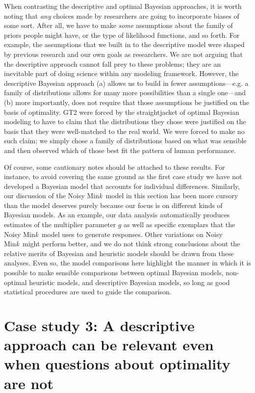 \documentclass[doc,floatsintext]{apa6}
\newcommand{\mink}{{Min\textit{k}\ }}
\begin{document}
When contrasting the descriptive and optimal Bayesian approaches, it is worth noting that {\it any} choices made by researchers are going to incorporate biases of some sort. After all, we have to make {\it some} assumptions about the family of priors people might have, or the type of likelihood functions, and so forth. For example, the assumptions that we built in to the descriptive model were shaped by previous research and our own goals as researchers. We are not arguing that the descriptive approach cannot fall prey to these problems; they are an inevitable part of doing science within any modeling framework.  However, the descriptive Bayesian approach (a) allows us to build in fewer assumptions---e.g. a family of distributions allows for many more possibilities than a single one---and (b) more importantly, does not require that those assumptions be justified on the basis of optimality. GT2 were forced by the straightjacket of optimal Bayesian modeling to have to claim that the distributions they chose were justified on the basis that they were well-matched to the real world. We were forced to make no such claim; we simply chose a family of distributions based on what was sensible and then observed which of those best fit the pattern of human performance.

Of course, some cautionary notes should be attached to these results. For instance, to avoid covering the same ground as the first case study we have not developed a Bayesian model that accounts for individual differences. Similarly, our discussion of the Noisy \mink model in this section has been more cursory than the model deserves purely because our focus is on different kinds of Bayesian models. As an example, our data analysis automatically produces estimates of the multiplier parameter $g$ as well as specific exemplars that the Noisy \mink model uses to generate responses. Other variations on Noisy \mink might perform better, and we do not think strong conclusions about the relative merits of Bayesian and heuristic models should be drawn from these analyses. Even so, the model comparisons here highlight the manner in which it is possible to make sensible comparisons between optimal Bayesian models, non-optimal heuristic models, and descriptive Bayesian models, so long as good statistical procedures are used to guide the comparison.





\section*{Case study 3: A descriptive approach can be relevant even when questions about optimality are not}
\end{document}

